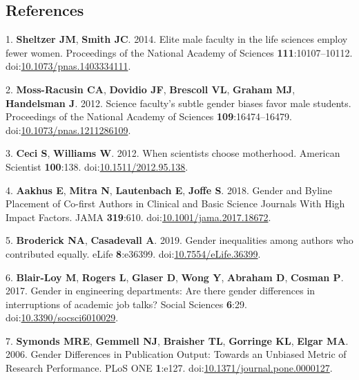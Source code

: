 \documentclass[11pt,]{article}
\begin{document}
\newpage

\hypertarget{references}{%
\subsection{References}\label{references}}

\hypertarget{refs}{}
\leavevmode\hypertarget{ref-sheltzer_elite_2014}{}%
1. \textbf{Sheltzer JM}, \textbf{Smith JC}. 2014. Elite male faculty in
the life sciences employ fewer women. Proceedings of the National
Academy of Sciences \textbf{111}:10107--10112.
doi:\href{https://doi.org/10.1073/pnas.1403334111}{10.1073/pnas.1403334111}.

\leavevmode\hypertarget{ref-moss-racusin_science_2012}{}%
2. \textbf{Moss-Racusin CA}, \textbf{Dovidio JF}, \textbf{Brescoll VL},
\textbf{Graham MJ}, \textbf{Handelsman J}. 2012. Science faculty's
subtle gender biases favor male students. Proceedings of the National
Academy of Sciences \textbf{109}:16474--16479.
doi:\href{https://doi.org/10.1073/pnas.1211286109}{10.1073/pnas.1211286109}.

\leavevmode\hypertarget{ref-Ceci2012}{}%
3. \textbf{Ceci S}, \textbf{Williams W}. 2012. When scientists choose
motherhood. American Scientist \textbf{100}:138.
doi:\href{https://doi.org/10.1511/2012.95.138}{10.1511/2012.95.138}.

\leavevmode\hypertarget{ref-aakhus_gender_2018}{}%
4. \textbf{Aakhus E}, \textbf{Mitra N}, \textbf{Lautenbach E},
\textbf{Joffe S}. 2018. Gender and Byline Placement of Co-first Authors
in Clinical and Basic Science Journals With High Impact Factors. JAMA
\textbf{319}:610.
doi:\href{https://doi.org/10.1001/jama.2017.18672}{10.1001/jama.2017.18672}.

\leavevmode\hypertarget{ref-broderick_gender_2019}{}%
5. \textbf{Broderick NA}, \textbf{Casadevall A}. 2019. Gender
inequalities among authors who contributed equally. eLife
\textbf{8}:e36399.
doi:\href{https://doi.org/10.7554/eLife.36399}{10.7554/eLife.36399}.

\leavevmode\hypertarget{ref-BlairLoy2017}{}%
6. \textbf{Blair-Loy M}, \textbf{Rogers L}, \textbf{Glaser D},
\textbf{Wong Y}, \textbf{Abraham D}, \textbf{Cosman P}. 2017. Gender in
engineering departments: Are there gender differences in interruptions
of academic job talks? Social Sciences \textbf{6}:29.
doi:\href{https://doi.org/10.3390/socsci6010029}{10.3390/socsci6010029}.

\leavevmode\hypertarget{ref-symonds_gender_2006}{}%
7. \textbf{Symonds MRE}, \textbf{Gemmell NJ}, \textbf{Braisher TL},
\textbf{Gorringe KL}, \textbf{Elgar MA}. 2006. Gender Differences in
Publication Output: Towards an Unbiased Metric of Research Performance.
PLoS ONE \textbf{1}:e127.
doi:\href{https://doi.org/10.1371/journal.pone.0000127}{10.1371/journal.pone.0000127}.
\end{document}

